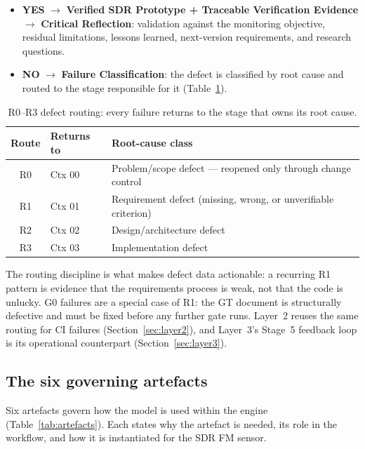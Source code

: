 \documentclass[11pt,a4paper]{article}
\begin{document}
\begin{itemize}
  \item \textbf{YES} $\rightarrow$ \textbf{Verified SDR Prototype + Traceable Verification
    Evidence} $\rightarrow$ \textbf{Critical Reflection}: validation against the monitoring
    objective, residual limitations, lessons learned, next-version requirements, and research
    questions.
  \item \textbf{NO} $\rightarrow$ \textbf{Failure Classification}: the defect is classified by
    root cause and routed to the stage responsible for it (Table~\ref{tab:routing}).
\end{itemize}

\begin{table}[htbp]
\centering
\caption{R0--R3 defect routing: every failure returns to the stage that owns its root cause.}
\label{tab:routing}
\small
\begin{tabular}{@{}clp{7.4cm}@{}}
\toprule
\textbf{Route} & \textbf{Returns to} & \textbf{Root-cause class} \\
\midrule
R0 & Ctx 00 & Problem/scope defect --- reopened only through change control \\
R1 & Ctx 01 & Requirement defect (missing, wrong, or unverifiable criterion) \\
R2 & Ctx 02 & Design/architecture defect \\
R3 & Ctx 03 & Implementation defect \\
\bottomrule
\end{tabular}
\end{table}

The routing discipline is what makes defect data actionable: a recurring R1 pattern is evidence
that the requirements process is weak, not that the code is unlucky. G0 failures are a special
case of R1: the GT document is structurally defective and must be fixed before any further gate
runs. Layer~2 reuses the same routing for CI failures (Section~\ref{sec:layer2}), and Layer~3's
Stage~5 feedback loop is its operational counterpart (Section~\ref{sec:layer3}).

\subsection{The six governing artefacts}
\label{sec:artefacts}

Six artefacts govern how the model is used within the engine
(Table~\ref{tab:artefacts}). Each states why the artefact is needed, its role in the workflow, and how
it is instantiated for the SDR FM sensor.
\end{document}
